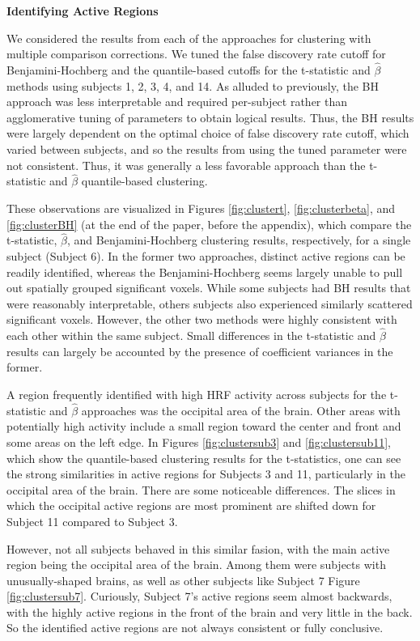 \noindent \textbf{Identifying Active Regions}

We considered the results from each of the approaches for clustering with 
multiple comparison corrections. We tuned the false discovery rate cutoff for 
Benjamini-Hochberg and the quantile-based cutoffs for the t-statistic and 
$\hat{\beta}$ methods using subjects 1, 2, 3, 4, and 14. As alluded to 
previously, the BH approach was less interpretable and required per-subject 
rather than agglomerative tuning of parameters to obtain logical results. 
Thus, the BH results were largely dependent on the optimal choice of false 
discovery rate cutoff, which varied between subjects, and so the results from 
using the tuned parameter were not consistent. Thus, it was generally a less 
favorable approach than the t-statistic and $\hat{\beta}$ quantile-based 
clustering. 

These observations are visualized in Figures \ref{fig:clustert}, 
\ref{fig:clusterbeta}, and \ref{fig:clusterBH} (at the end of the paper, 
before the appendix), which compare the t-statistic, $\hat{\beta}$, and 
Benjamini-Hochberg clustering results, respectively, for a 
single subject (Subject 6). In the former two approaches, distinct active 
regions can be readily identified, whereas the Benjamini-Hochberg seems 
largely unable to pull out spatially grouped significant voxels. While some 
subjects had BH results that were reasonably interpretable, others subjects 
also experienced similarly scattered significant voxels. However, the other 
two methods were highly consistent with each other within the same subject. 
Small differences in the t-statistic and $\hat{\beta}$ results can largely be 
accounted by the presence of coefficient variances in the former. 


A region frequently identified with high HRF activity across subjects for the 
t-statistic and $\hat{\beta}$ approaches was the occipital area of the brain. 
Other areas with potentially high activity include a small region toward the 
center and front and some areas on the left edge. In Figures 
\ref{fig:clustersub3} and \ref{fig:clustersub11}, which show the 
quantile-based clustering results for the t-statistics, one can see the strong 
similarities in active regions for Subjects 3 and 11, particularly in the 
occipital area of the brain. There are some noticeable differences. The slices in which 
the occipital active regions are most prominent are shifted down for Subject 11 
compared to Subject 3. 

However, not all subjects behaved in this similar fasion, with the main active 
region being the occipital area of the brain. Among them were subjects with 
unusually-shaped brains, as well as other subjects like Subject 7 Figure 
\ref{fig:clustersub7}. Curiously, Subject 7's active regions seem almost 
backwards, with the highly active regions in the front of the brain and very 
little in the back. So the identified active regions are not always 
consistent or fully conclusive. 




